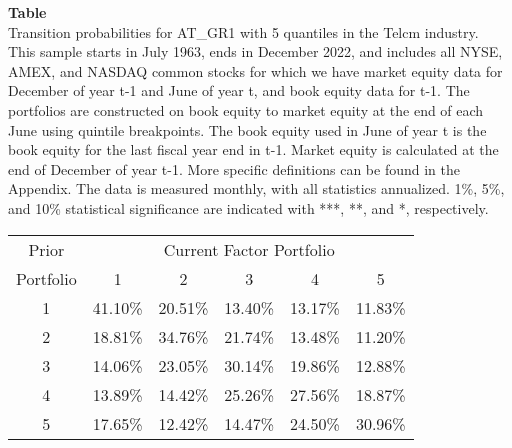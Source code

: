 \begin{table*}[ht!]
\raggedright
{}
\label{tab: transition_probs_AT_GR1_Telcm_with_5_quantiles}
\textbf{Table \thetable} \\
Transition probabilities for AT_GR1 with 5 quantiles in the Telcm industry. \\
\hspace*{1em}This sample starts in July 1963, ends in December 2022, and includes all NYSE, AMEX, and NASDAQ common stocks for which we have market equity data for December of year t-1 and June of year t, and book equity data for t-1. The portfolios are constructed on book equity to market equity at the end of each June using quintile breakpoints.  The book equity used in June of year t is the book equity for the last fiscal year end in t-1.  Market equity is calculated at the end of December of year t-1.  More specific definitions can be found in the Appendix.  The data is measured monthly, with all statistics annualized.  1\%, 5\%, and 10\% statistical significance are indicated with ***, **, and *, respectively. \\
\vspace{0.5em}
\centering
\begin{adjustbox}{max width=\textwidth}
\begin{tabular}{@{}cccccc@{}}
\toprule
Prior & \multicolumn{5}{c}{Current Factor Portfolio} \\
Portfolio & 1 & 2 & 3 & 4 & 5 \\
\midrule
1 & 41.10\% & 20.51\% & 13.40\% & 13.17\% & 11.83\% \\
2 & 18.81\% & 34.76\% & 21.74\% & 13.48\% & 11.20\% \\
3 & 14.06\% & 23.05\% & 30.14\% & 19.86\% & 12.88\% \\
4 & 13.89\% & 14.42\% & 25.26\% & 27.56\% & 18.87\% \\
5 & 17.65\% & 12.42\% & 14.47\% & 24.50\% & 30.96\% \\
\bottomrule
\end{tabular}
\end{adjustbox}
\end{table*}